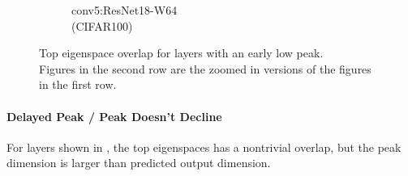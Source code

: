 \begin{figure}[h]
\begin{subfigure}[b]{0.23\textwidth}
        \caption{conv5:ResNet18-W64\\(CIFAR100)}
        \label{fig:app_adexp_overlap_early_resnet}
    \end{subfigure}
    \captionsetup{justification=centering}
    \caption{Top eigenspace overlap for layers with an early low peak.\\Figures in the second row are the zoomed in versions of the figures in the first row.}
    \label{fig:app_adexp_failure_early}
\end{figure}

\paragraph{Delayed Peak / Peak Doesn't Decline} 
For layers shown in , the top eigenspaces has a nontrivial overlap, but the peak dimension is larger than predicted output dimension.


